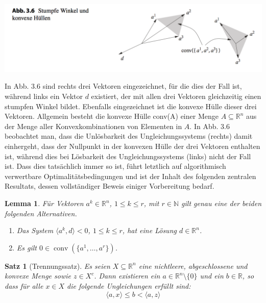 \documentclass[11pt]{scrreprt}
\newcounter{thm}
\theoremstyle{thmstyle}
\numberwithin{thm}{section}
\newtheorem{lemma}[thm]{Lemma}
\newtheorem{satz}[thm]{Satz}
\begin{document}
\begin{center}
	\includegraphics[scale=0.5]{img/ab36}
\end{center} 
 
In Abb. 3.6 sind rechts drei Vektoren eingezeichnet, für die dies der Fall ist, während links ein Vektor $d$ existiert, der mit allen drei Vektoren gleichzeitig einen stumpfen Winkel bildet. Ebenfalls eingezeichnet ist die konvexe Hülle dieser drei Vektoren. Allgemein besteht die konvexe Hülle conv(A) einer Menge $A \subseteq \mathbb{R}^n$ aus der Menge aller Konvexkombinationen von Elementen in $A$. In Abb. 3.6 beobachtet man, dass die Unlösbarkeit des Ungleichungssystems (rechts) damit einhergeht, dass der Nullpunkt in der konvexen Hülle der drei Vektoren enthalten ist, während dies bei Lösbarkeit des Ungleichungssystems (links) nicht der Fall ist. Dass dies tatsächlich immer so ist, führt letztlich auf algorithmisch verwertbare Optimalitätsbedingungen und ist der Inhalt des folgenden zentralen Resultats, dessen vollständiger Beweis einiger Vorbereitung bedarf.
 
\begin{lemma}
	Für Vektoren $a^k \in \mathbb{R}^n$, $1 \leq k \leq r$, mit $r \in \mathbb{N}$ gilt genau eine der beiden folgenden Alternativen.
	\begin{enumerate}[label=\alph*\upshape)]
		\item Das System $\langle a^k, d \rangle < 0$, $1 \leq k \leq r$, hat eine Lösung $d \in \mathbb{R}^n$.
		\item Es gilt $0 \in \operatorname{conv}(\{ a^1, \dotsc, a^r \})$.
	\end{enumerate}
\end{lemma} 

\begin{satz}[Trennungssatz] Es seien $X \subseteq \mathbb{R}^n$ eine nichtleere, abgeschlossene und konvexe Menge sowie $z \in X^c$. Dann existieren ein $a \in \mathbb{R}^n \setminus \{ 0 \}$ und ein $b \in \mathbb{R}$, so dass für alle $x \in X$ die folgende Ungleichungen erfüllt sind:
	$$ \langle a, x \rangle \leq b < \langle a, z \rangle $$
\end{satz}
 
\end{document}
